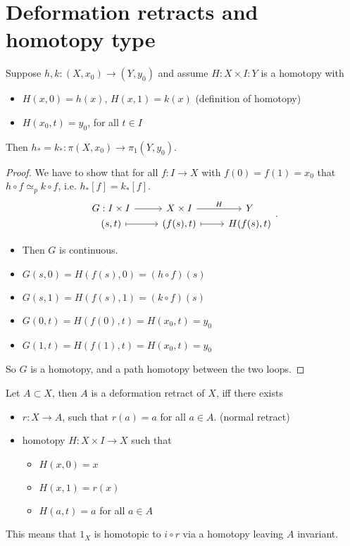 \section{Deformation retracts and homotopy type}
\begin{lemma}
    Suppose $h, k: (X, x_0) \to (Y, y_0)$ and assume $H: X \times I: Y$ is a homotopy with
    \begin{itemize}
        \item $H(x, 0) = h(x)$, $H(x, 1) = k(x)$ (definition of homotopy)
        \item $H(x_0, t) = y_0$, for all $t \in I$
    \end{itemize}
    Then $h_* = k_*: \pi(X,x_0) \to \pi_1(Y, y_0)$.
\end{lemma}
\begin{proof}
    We have to show that for all $f: I \to X$ with $f(0) = f(1) = x_0$ that $h  \circ  f \simeq_p  k  \circ  f$, i.e. $h_*[f] = k_*[f]$.
    \[
        \begin{tikzcd}[row sep=0em]
        G: I \times I \arrow[r]  & X \times I \arrow[r, "H"] &Y\\
        (s, t) \arrow[r, mapsto] & (f(s), t)  \arrow[r, mapsto] & H(f(s), t)
    \end{tikzcd}
    .\] 
    \begin{itemize}
        \item Then $G$ is continuous.
        \item $G(s, 0) = H(f(s), 0) = (h  \circ  f)(s)$
        \item $G(s, 1) = H(f(s), 1) = (k  \circ  f)(s)$
        \item $G(0, t) = H(f(0), t) = H(x_0, t) = y_0$
        \item $G(1, t) = H(f(1), t) = H(x_0, t) = y_0$
    \end{itemize}
    So $G$ is a homotopy, and a path homotopy between the two loops.
\end{proof}
\begin{definition}
    Let $A \subset X$, then $A$ is a deformation retract of $X$, iff there exists 
    \begin{itemize}
        \item $r: X \to A$, such that $r(a) = a$ for all  $a \in A$. (normal retract)
        \item homotopy $H: X \times I \to X$ such that
            \begin{itemize}
                \item $H(x, 0) = x$
                \item  $H(x, 1) = r(x)$
                \item $H(a, t) = a$ for all $a \in A$
            \end{itemize}
    \end{itemize}
    This means that $1_X$ is homotopic to $i \circ r$ via a homotopy leaving $A$ invariant.
\end{definition}
